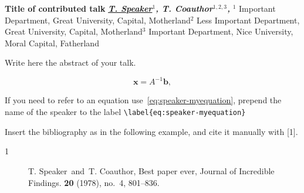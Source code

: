 \documentclass{scrbook}
\newenvironment{abstract}[4] %
{\filbreak %
	{\large \bfseries #1}                                         %
	{\bfseries \itshape #2,} #3 \hfill {#4}                       %
}                                                                 %
{}                                                                %
\numberwithin{equation}{part}                                     %
\begin{document}
\begin{abstract}{Title of contributed talk}{%
		\underline{T. Speaker}$^{1}$, T. Coauthor$^{1,2,3}$}{%
	}{%
		\newline{}$^1$ Important Department, Great University, Capital, Motherland\newline{}$^2$ Less Important Department, Great University, Capital, Motherland\newline{}$^3$ Important Department, Nice University, Moral Capital, Fatherland}

	Write here the abstract of your talk.

	\begin{equation}\label{eq:speaker-myequation}
	\mathbf{x} = A^{-1}\mathbf{b},
	\end{equation}

	If you need to refer to an equation use~\eqref{eq:speaker-myequation}, prepend the name of the speaker to the label \verb|\label{eq:speaker-myequation}|

	Insert the bibliography as in the following example, and cite it manually with [1].

	\begin{description}
		\item[1] T. Speaker\ and\ T. Coauthor, Best paper ever, Journal of Incredible Findings. \textbf{20} (1978), no.~4, 801--836. 
	\end{description}


\end{abstract}
\end{document}
